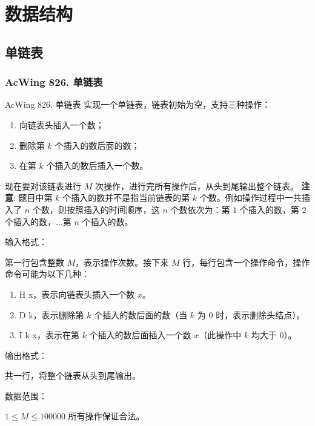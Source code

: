 \chapter{数据结构}


\section{单链表}

\subsection{AcWing 826. 单链表}

\begin{titledbox}{AcWing 826. 单链表}
    实现一个单链表，链表初始为空，支持三种操作：
    \begin{enumerate}
        \itemsep=-5pt
        \item 向链表头插入一个数；
        \item 删除第 $k$ 个插入的数后面的数；
        \item 在第 $k$ 个插入的数后插入一个数。
    \end{enumerate}

    现在要对该链表进行 $M$ 次操作，进行完所有操作后，从头到尾输出整个链表。
    \textbf{注意}: 题目中第 $k$ 个插入的数并不是指当前链表的第 $k$ 个数。例如操作过程中一共插入了 $n$ 个数，则按照插入的时间顺序，这 $n$ 个数依次为：第 $1$ 个插入的数，第 $2$ 个插入的数，$\dots$第 $n$ 个插入的数。

    输入格式：

    第一行包含整数 $M$，表示操作次数。接下来 $M$ 行，每行包含一个操作命令，操作命令可能为以下几种：

    \begin{enumerate}
        \itemsep=-5pt
        \item H x，表示向链表头插入一个数 $x$。
        \item D k，表示删除第 $k$ 个插入的数后面的数（当 $k$ 为 $0$ 时，表示删除头结点）。
        \item I k x，表示在第 $k$ 个插入的数后面插入一个数 $x$（此操作中 $k$ 均大于 $0$）。
    \end{enumerate}

    输出格式：

    共一行，将整个链表从头到尾输出。

    数据范围：

    $1 \le M \le 100000$ 所有操作保证合法。


\end{titledbox}
